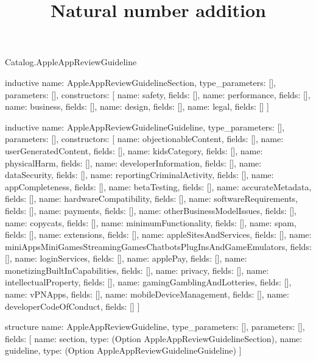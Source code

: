 \begin{lexlean}{Catalog.AppleAppReviewGuideline}
\title{Natural number addition}
\begin{semanticmodule}
inductive{
  name: AppleAppReviewGuidelineSection,
  type_parameters: [],
  parameters: [],
  constructors: [
    {name: safety, fields: []},
    {name: performance, fields: []},
    {name: business, fields: []},
    {name: design, fields: []},
    {name: legal, fields: []}
  ]
}

inductive{
  name: AppleAppReviewGuidelineGuideline,
  type_parameters: [],
  parameters: [],
  constructors: [
    {name: objectionableContent, fields: []},
    {name: userGeneratedContent, fields: []},
    {name: kidsCategory, fields: []},
    {name: physicalHarm, fields: []},
    {name: developerInformation, fields: []},
    {name: dataSecurity, fields: []},
    {name: reportingCriminalActivity, fields: []},
    {name: appCompleteness, fields: []},
    {name: betaTesting, fields: []},
    {name: accurateMetadata, fields: []},
    {name: hardwareCompatibility, fields: []},
    {name: softwareRequirements, fields: []},
    {name: payments, fields: []},
    {name: otherBusinessModelIssues, fields: []},
    {name: copycats, fields: []},
    {name: minimumFunctionality, fields: []},
    {name: spam, fields: []},
    {name: extensions, fields: []},
    {name: appleSitesAndServices, fields: []},
    {name: miniAppsMiniGamesStreamingGamesChatbotsPlugInsAndGameEmulators, fields: []},
    {name: loginServices, fields: []},
    {name: applePay, fields: []},
    {name: monetizingBuiltInCapabilities, fields: []},
    {name: privacy, fields: []},
    {name: intellectualProperty, fields: []},
    {name: gamingGamblingAndLotteries, fields: []},
    {name: vPNApps, fields: []},
    {name: mobileDeviceManagement, fields: []},
    {name: developerCodeOfConduct, fields: []}
  ]
}

structure{
  name: AppleAppReviewGuideline,
  type_parameters: [],
  parameters: [],
  fields: [
    {name: section, type: (Option AppleAppReviewGuidelineSection)},
    {name: guideline, type: (Option AppleAppReviewGuidelineGuideline)}
  ]
}
\end{semanticmodule}
\end{lexlean}
